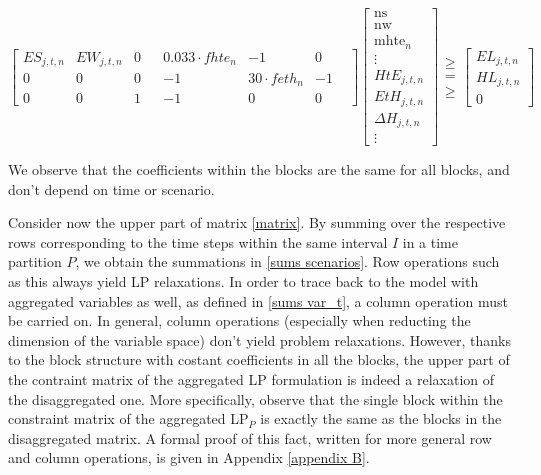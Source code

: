 \documentclass[smallextended,natbib]{svjour3}       %
\numberwithin{theorem}{section}
\begin{document}
\begin{equation}
\left[
\begin{array}{ccc|ccccc}
    ES_{j,t,n} & EW_{j,t,n} &0& & 0.033\cdot fhte_{n} & -1 & 0 & \\
    0          & 0          &0&  & -1  & 30\cdot feth_n & -1 & \\
    0          & 0          &1 &  & -1   & 0 & 0 &
\end{array}
\right]
  \begin{bmatrix}
    \text{ns}  \\
    \text{nw} \\
    \text{mhte$_n$} \\
    \hline
    \vdots \\
    HtE_{j,t,n} \\
    EtH_{j,t,n} \\
    \Delta H_{j,t,n}\\
    \vdots
  \end{bmatrix}
  \begin{matrix}
  \geq \\
  =\\
  \geq
  \end{matrix}
  \begin{bmatrix}
    EL_{j,t,n} \\
    HL_{j,t,n} \\
    0
  \end{bmatrix}
  \end{equation}  

We observe that the coefficients within the blocks are the same for all blocks, and don't depend on time or scenario.

Consider now the upper part of matrix \ref{matrix}. 
By summing over the respective rows corresponding to the time steps within the same interval $I$ in a time partition $P$, we obtain the summations in \ref{sums scenarios}. 
Row operations such as this always yield LP relaxations. 
In order to trace back to the model with aggregated variables as well, as defined in \ref{sums var_t}, a column operation must be carried on. 
In general, column operations (especially when reducting the dimension of the variable space) don't yield problem relaxations. 
However, thanks to the block structure with costant coefficients in all the blocks, the upper part of the contraint matrix of the aggregated LP formulation is indeed a relaxation of the disaggregated one.
More specifically, observe that the single block within the constraint matrix of the aggregated LP$_{P}$ is exactly the same as the blocks in the disaggregated matrix.
A formal proof of this fact, written for more general row and column operations, is given in Appendix \ref{appendix B}.
\end{document}
